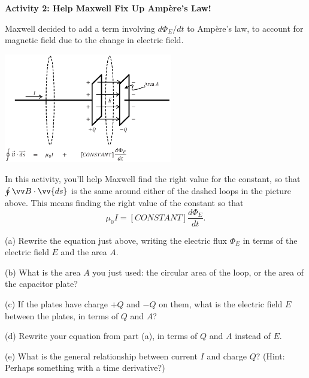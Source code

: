 \pagebreak
\textbf{Activity 2: Help Maxwell Fix Up Amp\`ere's Law!}

Maxwell decided to add a term involving $d\Phi_E/dt$ to Amp\`ere's law, to account for magnetic field due to the change in electric field.
\begin{center}
\vspace{-0.2in}
    \includegraphics[width=0.55\textwidth]{deriving_em_waves/two_loops_with_equation.eps}
\vspace{-0.1in}
\end{center}

In this activity, you'll help Maxwell find the right value for the constant, so that $\oint \vv B \cdot \vv{ds}$ is the same around either of the dashed loops in the picture above.  This means finding the right value of the constant so that
\begin{displaymath}
\mu_0I = [CONSTANT] \frac{d\Phi_E}{dt}.
\end{displaymath}

\vspace{-0.1in}
(a) Rewrite the equation just above, writing the electric flux $\Phi_E$ in terms of the electric field $E$ and the area $A$.
\vspace{0.4in}

(b) What is the area $A$ you just used: the circular area of the loop, or the area of the capacitor plate?
\vspace{0.3in}

(c) If the plates have charge $+Q$ and $-Q$ on them, what is the electric field $E$ between the plates, in terms of $Q$ and $A$?
\vspace{0.6in}

(d) Rewrite your equation from part (a), in terms of $Q$ and $A$ instead of $E$.
\vspace{0.5in}

(e) What is the general relationship between current $I$ and charge $Q$? (Hint: Perhaps something with a time derivative?)
\vspace{0.3in}

